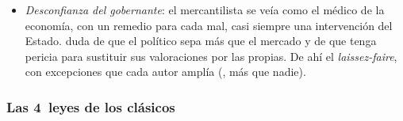 \documentclass[11pt]{article}
\begin{document}
\begin{itemize}
\begin{itemize}
\begin{itemize}
    \item Por eso la teoría clásica, a diferencia de la neoclásica, es \emph{dinámica}: los neoclásicos estudiarán desde los años 70~la asignación de recursos escasos con estática comparativa, y cambiarán también la pregunta, el sujeto, el valor, la distribución, el método y la política .
    \end{itemize}
  \item \emph{Desconfianza del gobernante}: el mercantilista se veía como el médico de la economía, con un remedio para cada mal, casi siempre una intervención del Estado.  duda de que el político sepa más que el mercado y de que tenga pericia para sustituir sus valoraciones por las propias. De ahí el \emph{laissez-faire}, con excepciones que cada autor amplía (, más que nadie).
  \end{itemize}
\end{itemize}

\subsubsection{Las 4~leyes de los clásicos}\label{sec:leyes}
\end{document}
